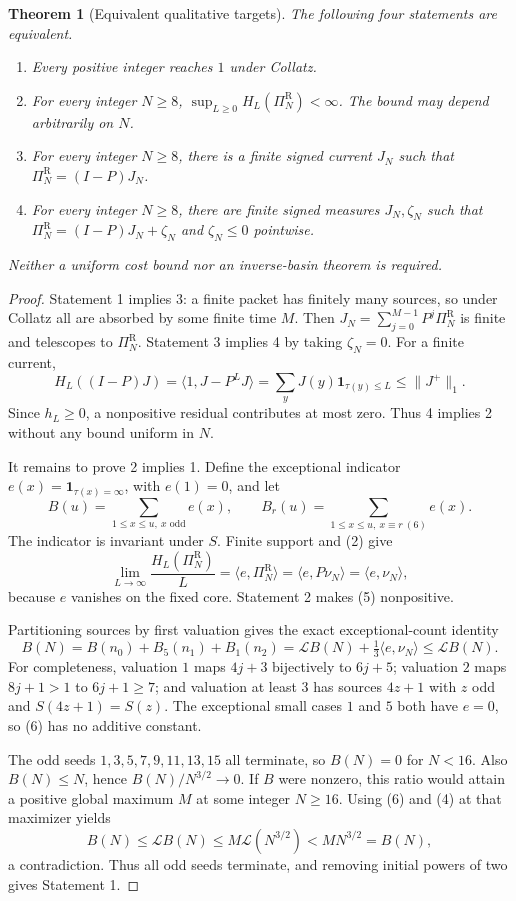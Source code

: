 \documentclass[11pt]{article}
\newtheorem{theorem}{Theorem}
\newcommand{\PiR}{\Pi^{\mathrm R}}
\newcommand{\Lip}{\mathcal L}
\begin{document}
\begin{theorem}[Equivalent qualitative targets]
The following four statements are equivalent.
\begin{enumerate}
\item Every positive integer reaches $1$ under Collatz.
\item For every integer $N\ge8$, $\sup_{L\ge0}H_L(\PiR_N)<\infty$.
      The bound may depend arbitrarily on $N$.
\item For every integer $N\ge8$, there is a finite signed current $J_N$
      such that $\PiR_N=(I-P)J_N$.
\item For every integer $N\ge8$, there are finite signed measures $J_N,\zeta_N$
      such that $\PiR_N=(I-P)J_N+\zeta_N$ and $\zeta_N\le0$ pointwise.
\end{enumerate}
Neither a uniform cost bound nor an inverse-basin theorem is required.
\end{theorem}
\begin{proof}
Statement 1 implies 3: a finite packet has finitely many sources, so under
Collatz all are absorbed by some finite time $M$. Then
$J_N=\sum_{j=0}^{M-1}P^j\PiR_N$ is finite and telescopes to $\PiR_N$.
Statement 3 implies 4 by taking $\zeta_N=0$. For a finite current,
\[
H_L((I-P)J)=\langle1,J-P^LJ\rangle
=\sum_yJ(y)\mathbf1_{\tau(y)\le L}\le\|J^+\|_1.
\]
Since $h_L\ge0$, a nonpositive residual contributes at most zero. Thus 4
implies 2 without any bound uniform in $N$.

It remains to prove 2 implies 1. Define the exceptional indicator
$e(x)=\mathbf1_{\tau(x)=\infty}$, with $e(1)=0$, and let
\[
B(u)=\sum_{1\le x\le u,\ x\text{ odd}}e(x),\qquad
B_r(u)=\sum_{1\le x\le u,\ x\equiv r\ (6)}e(x).
\]
The indicator is invariant under $S$. Finite support and (2) give
\[
\lim_{L\to\infty}\frac{H_L(\PiR_N)}L
=\langle e,\PiR_N\rangle
=\langle e,P\nu_N\rangle
=\langle e,\nu_N\rangle,                                  \tag{5}
\]
because $e$ vanishes on the fixed core. Statement 2 makes (5) nonpositive.

Partitioning sources by first valuation gives the exact exceptional-count
identity
\[
B(N)=B(n_0)+B_5(n_1)+B_1(n_2)
=\Lip B(N)+\tfrac13\langle e,\nu_N\rangle
\le\Lip B(N).                                               \tag{6}
\]
For completeness, valuation $1$ maps $4j+3$ bijectively to $6j+5$;
valuation $2$ maps $8j+1>1$ to $6j+1\ge7$; and valuation at least $3$
has sources $4z+1$ with $z$ odd and $S(4z+1)=S(z)$. The exceptional small
cases $1$ and $5$ both have $e=0$, so (6) has no additive constant.

The odd seeds $1,3,5,7,9,11,13,15$ all terminate, so $B(N)=0$ for $N<16$.
Also $B(N)\le N$, hence $B(N)/N^{3/2}\to0$. If $B$ were nonzero, this
ratio would attain a positive global maximum $M$ at some integer $N\ge16$.
Using (6) and (4) at that maximizer yields
\[
B(N)\le\Lip B(N)\le M\Lip(N^{3/2})
<M N^{3/2}=B(N),
\]
a contradiction. Thus all odd seeds terminate, and removing initial powers
of two gives Statement 1.
\end{proof}
\end{document}
